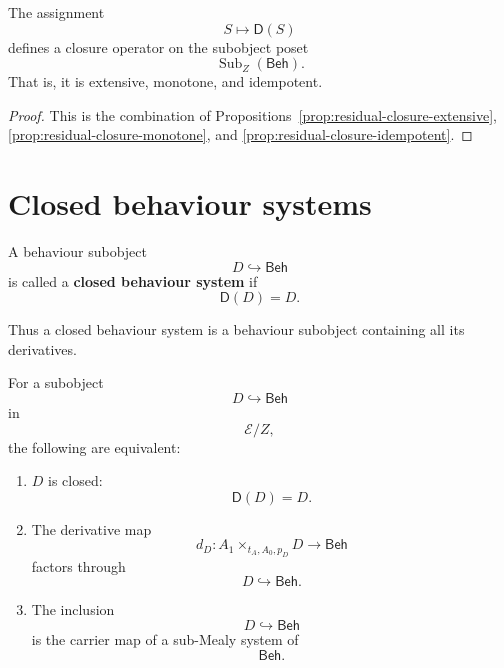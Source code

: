 \begin{theorem}
\label{thm:residual-closure-operator}
The assignment
\[
S\longmapsto \mathsf D(S)
\]
defines a closure operator on the subobject poset
\[
\operatorname{Sub}_Z(\mathsf{Beh}).
\]
That is, it is extensive, monotone, and idempotent.
\end{theorem}

\begin{proof}
This is the combination of
Propositions~\ref{prop:residual-closure-extensive},
\ref{prop:residual-closure-monotone}, and
\ref{prop:residual-closure-idempotent}.
\end{proof}

\section{Closed behaviour systems}
\label{sec:closed-behaviour-systems}

\begin{definition}
\label{def:closed-behaviour-system}
A behaviour subobject
\[
D\hookrightarrow\mathsf{Beh}
\]
is called a \textbf{closed behaviour system} if
\[
\mathsf D(D)=D.
\]
\end{definition}

Thus a closed behaviour system is a behaviour subobject containing all its
derivatives.

\begin{theorem}
\label{thm:closed-iff-submealy}
For a subobject
\[
D\hookrightarrow\mathsf{Beh}
\]
in
\[
\mathcal E/Z,
\]
the following are equivalent:
\begin{enumerate}
\item \(D\) is closed:
\[
\mathsf D(D)=D.
\]
\item The derivative map
\[
d_D:
A_1\times_{t_A,A_0,p_D}D\to\mathsf{Beh}
\]
factors through
\[
D\hookrightarrow\mathsf{Beh}.
\]
\item The inclusion
\[
D\hookrightarrow\mathsf{Beh}
\]
is the carrier map of a sub-Mealy system of
\[
\mathsf{Beh}.
\]
\end{enumerate}
\end{theorem}

